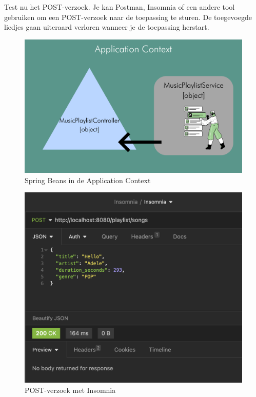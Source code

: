 Test nu het POST-verzoek.  Je kan Postman,  Insomnia of een andere tool gebruiken om een POST-verzoek naar de toepassing te sturen.  De toegevoegde liedjes gaan uiteraard verloren wanneer je de toepassing herstart. 

\begin{figure}[H]
  \includegraphics[width=\linewidth]{images/chapter-rest/applicationcontext_musicplaylist.png}
  \caption{Spring Beans in de Application Context}
  \label{fig:spring_beans_musicplaylist}
\end{figure}


\begin{figure}[H]
  \includegraphics[width=\linewidth]{images/chapter-rest/insomnia_post.png}
  \caption{POST-verzoek met Insomnia}
  \label{fig:post_request}
\end{figure}

